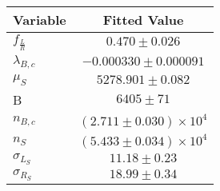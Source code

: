 \begin{tabular}[t]{lc}
\hline
Variable &Fitted Value\\
\hline\hline
$f_{\frac{L}{R}}$&$0.470\pm0.026$\\
\hline
$\lambda_{B,c}$&$-0.000330\pm0.000091$\\
\hline
$\mu_S$&$5278.901\pm0.082$\\
\hline
B&$6405\pm71$\\
\hline
$n_{B,c}$&$(2.711\pm0.030)\times 10^4$\\
\hline
$n_S$&$(5.433\pm0.034)\times 10^4$\\
\hline
$\sigma_{L_S}$&$11.18\pm0.23$\\
\hline
$\sigma_{R_S}$&$18.99\pm0.34$\\
\hline
\end{tabular}